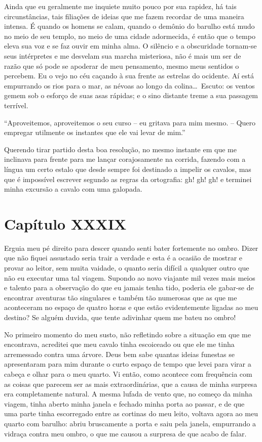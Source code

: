  Ainda que eu geralmente me inquiete muito pouco por sua rapidez, há
tais circunstâncias, tais filiações de ideias que me fazem recordar de
uma maneira intensa. É quando os homens se calam, quando o demônio do
barulho está mudo no meio de seu templo, no meio de uma cidade
adormecida, é então que o tempo eleva sua voz e se faz ouvir em minha
alma. O silêncio e a obscuridade tornam-se seus intérpretes e me
desvelam sua marcha misteriosa, não é mais um ser de razão que só pode
se apoderar de meu pensamento, mesmo meus sentidos o percebem. Eu o
vejo no céu caçando à sua frente as estrelas do ocidente. Aí está
empurrando os rios para o mar, as névoas ao longo da colina\ldots\ Escuto:
os ventos gemem sob o esforço de suas asas rápidas; e o sino distante
treme a sua passagem terrível.

 ``Aproveitemos, aproveitemos o seu curso -- eu gritava para mim mesmo. --
Quero empregar utilmente os instantes que ele vai levar de mim.''

 Querendo tirar partido desta boa resolução, no mesmo instante em que me
inclinava para frente para me lançar corajosamente na corrida, fazendo
com a língua um certo estalo que desde sempre foi destinado a impelir
os cavalos, mas que é impossível escrever segundo as regras da
ortografia: gh!     gh!     gh!
e terminei minha excursão a cavalo com uma galopada.

\section{Capítulo XXXIX}

 Erguia meu pé direito para descer quando senti bater fortemente no
ombro. Dizer que não fiquei assustado seria trair a verdade e esta é a
ocasião de mostrar e provar ao leitor, sem muita vaidade, o quanto
seria difícil a qualquer outro que não eu executar uma tal viagem.
Supondo ao novo viajante mil vezes mais meios e talento para a
observação do que eu jamais tenha tido, poderia ele gabar-se de encontrar
aventuras tão singulares e também tão numerosas que as que me
aconteceram no espaço de quatro horas e que estão evidentemente ligadas
ao meu destino? Se alguém duvida, que tente adivinhar quem me bateu no
ombro!

 No primeiro momento do meu susto, não refletindo sobre a situação em
que me encontrava, acreditei que meu cavalo tinha escoiceado ou que ele
me tinha arremessado contra uma árvore. Deus bem sabe quantas ideias
funestas se apresentaram para mim durante o curto espaço de tempo que
levei para virar a cabeça e olhar para o meu quarto. Vi então, como
acontece com frequência com as coisas que parecem ser as mais
extraordinárias, que a causa de minha surpresa era completamente
natural. A mesma lufada de vento que, no começo da minha viagem, tinha
aberto minha janela e fechado minha porta ao passar, e de que uma parte
tinha escorregado entre as cortinas do meu leito, voltava agora ao meu
quarto com barulho: abriu bruscamente a porta e saiu pela janela,
empurrando a vidraça contra meu ombro, o que me causou a surpresa de
que acabo de falar.

